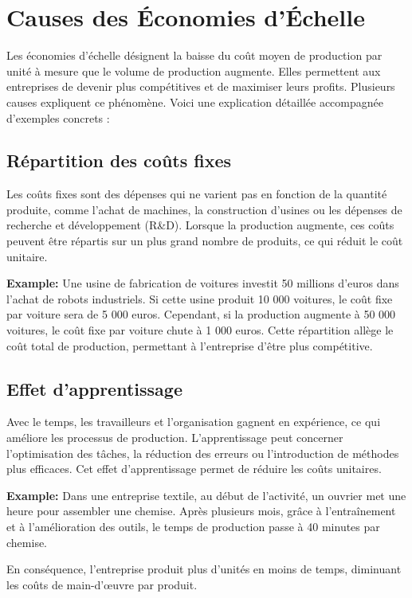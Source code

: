 \chapter*{Causes des Économies d'Échelle}
\setcounter{chapter}{1}



Les économies d'échelle désignent la baisse du coût moyen de production par
unité à mesure que le volume de production augmente. Elles permettent aux
entreprises de devenir plus compétitives et de maximiser leurs profits. Plusieurs
causes expliquent ce phénomène. Voici une explication détaillée accompagnée
d'exemples concrets :

\section{Répartition des coûts fixes}

Les coûts fixes sont des dépenses qui ne varient pas en fonction de la quantité
produite, comme l'achat de machines, la construction d'usines ou les dépenses de
recherche et développement (R&D). Lorsque la production augmente, ces coûts
peuvent être répartis sur un plus grand nombre de produits, ce qui réduit le coût
unitaire. 
\par
\textbf{Example:}
Une usine de fabrication de voitures investit 50 millions d'euros dans l'achat de
robots industriels. Si cette usine produit 10 000 voitures, le coût fixe par voiture
sera de 5 000 euros. Cependant, si la production augmente à 50 000 voitures, le
coût fixe par voiture chute à 1 000 euros. Cette répartition allège le coût total de
production, permettant à l’entreprise d’être plus compétitive.

\section{Effet d'apprentissage}

Avec le temps, les travailleurs et l’organisation gagnent en expérience, ce qui
améliore les processus de production. L’apprentissage peut concerner
l’optimisation des tâches, la réduction des erreurs ou l’introduction de méthodes
plus efficaces. Cet effet d’apprentissage permet de réduire les coûts unitaires.
\par
\textbf{Example:}
Dans une entreprise textile, au début de l’activité, un ouvrier met une heure pour
assembler une chemise. Après plusieurs mois, grâce à l’entraînement et à
l’amélioration des outils, le temps de production passe à 40 minutes par chemise.
\par
En conséquence, l’entreprise produit plus d’unités en moins de temps, diminuant
les coûts de main-d'œuvre par produit.

